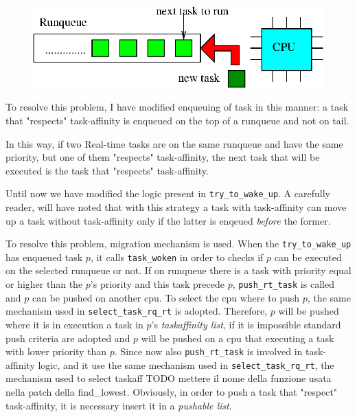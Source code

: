\begin{figure}[htbp]
\centering
\includegraphics[width=\widefigure]{images/enq_head.eps}
\caption{}
\label{fig:enq_head}
\end{figure}

To resolve this problem, I have modified enqueuing of task in this manner: a task that "respects" task-affinity is enqueued on the top of a runqueue and not 
on tail. 

In this way, if two Real-time tasks are on the same runqueue and have the same priority, but one of them "respects" task-affinity, the next task that 
will be executed is the task that "respects" task-affinity. 

Until now we have modified the logic present in \texttt{try\_to\_wake\_up}. A carefully reader, will have noted that with this strategy a task with 
task-affinity can move up a task without task-affinity only if the latter is enqeued \textit{before} the former.

To resolve this problem, migration mechanism is used. When the \texttt{try\_to\_wake\_up} has enqueued task $p$, it calls \texttt{task\_woken} in order to
checks if $p$ can be executed on the selected runqueue or not. If on runqueue there is a task with priority equal or higher than the $p$'s priority and 
this task precede $p$, \texttt{push\_rt\_task} is called and $p$ can be pushed on another cpu. To select the cpu where to push $p$, the same mechanism used 
in \texttt{select\_task\_rq\_rt} is adopted. Therefore, $p$ will be pushed where it is in execution a task in $p$'s \textit{taskaffinity list}, if it is 
impossible standard push criteria are adopted and $p$ will be pushed on a cpu that executing a task with lower priority than $p$. Since now also 
\texttt{push\_rt\_task} is involved in task-affinity logic, and it use the same mechanism used in \texttt{select\_task\_rq\_rt},  the mechanism used to 
select taskaff TODO mettere il nome della funzione usata nella patch della find\_lowest. Obviously, in order to push a task that "respect" task-affinity, 
it is necessary insert it in a \textit{pushable list}. 

